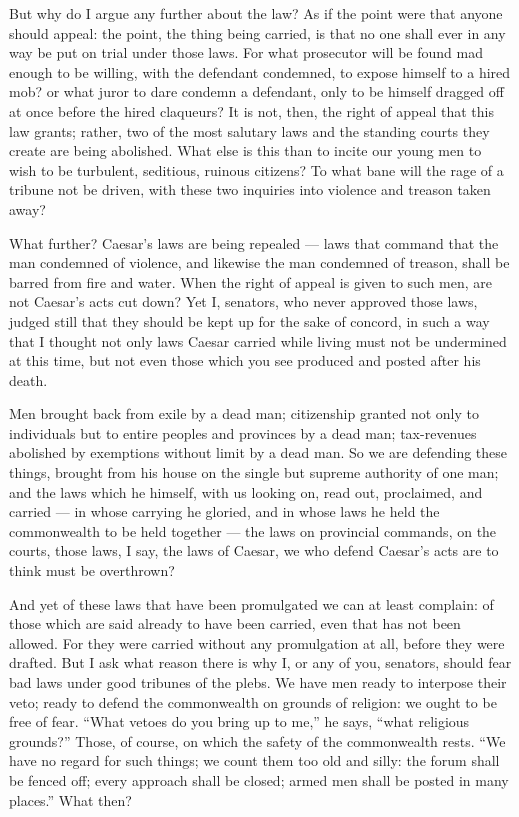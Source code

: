  But why do I argue any further about the law? As if the point were that anyone should appeal: the point, the thing being carried, is that no one shall ever in any way be put on trial under those laws. For what prosecutor will be found mad enough to be willing, with the defendant condemned, to expose himself to a hired mob? or what juror to dare condemn a defendant, only to be himself dragged off at once before the hired claqueurs? It is not, then, the right of appeal that this law grants; rather, two of the most salutary laws and the standing courts they create are being abolished. What else is this than to incite our young men to wish to be turbulent, seditious, ruinous citizens? To what bane will the rage of a tribune not be driven, with these two inquiries into violence and treason taken away?

 What further? Caesar's laws are being repealed --- laws that command that the man condemned of violence, and likewise the man condemned of treason, shall be barred from fire and water. When the right of appeal is given to such men, are not Caesar's acts cut down? Yet I, senators, who never approved those laws, judged still that they should be kept up for the sake of concord, in such a way that I thought not only laws Caesar carried while living must not be undermined at this time, but not even those which you see produced and posted after his death.

 Men brought back from exile by a dead man; citizenship granted not only to individuals but to entire peoples and provinces by a dead man; tax-revenues abolished by exemptions without limit by a dead man. So we are defending these things, brought from his house on the single but supreme authority of one man; and the laws which he himself, with us looking on, read out, proclaimed, and carried --- in whose carrying he gloried, and in whose laws he held the commonwealth to be held together --- the laws on provincial commands, on the courts, those laws, I say, the laws of Caesar, we who defend Caesar's acts are to think must be overthrown?

 And yet of these laws that have been promulgated we can at least complain: of those which are said already to have been carried, even that has not been allowed. For they were carried without any promulgation at all, before they were drafted. But I ask what reason there is why I, or any of you, senators, should fear bad laws under good tribunes of the plebs. We have men ready to interpose their veto; ready to defend the commonwealth on grounds of religion: we ought to be free of fear. ``What vetoes do you bring up to me,'' he says, ``what religious grounds?'' Those, of course, on which the safety of the commonwealth rests. ``We have no regard for such things; we count them too old and silly: the forum shall be fenced off; every approach shall be closed; armed men shall be posted in many places.'' What then?

